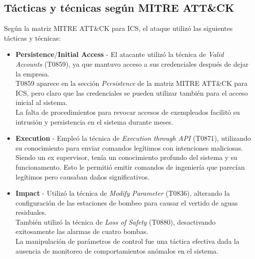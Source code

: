 \nl

\subsection{Tácticas y técnicas según MITRE ATT\&CK}
Según la matriz MITRE ATT\&CK para ICS, el ataque utilizó las siguientes tácticas y técnicas:

\begin{itemize}
    \item \textbf{Persistence}/\textbf{Initial Access} - El atacante utilizó la técnica de \textit{Valid Accounts} (T0859), ya que mantuvo acceso a sus credenciales después de dejar la empresa.\\
    T0859 aparece en la sección \textit{Persistence} de la matriz MITRE ATT\&CK para ICS, pero claro que las credenciales se pueden utilizar también para el acceso inicial al sistema.\\
    La falta de procedimientos para revocar accesos de exempleados facilitó su intrusión y persistencia en el sistema durante meses.
    
    
    \item \textbf{Execution} - Empleó la técnica de \textit{Execution through API} (T0871), utilizando su conocimiento para enviar comandos legítimos con intenciones maliciosas.\\
    Siendo un ex supervisor, tenía un conocimiento profundo del sistema y su funcionamento. Esto le permitió emitir comandos de ingeniería que parecían legítimos pero causaban daños significativos.
    
    \item \textbf{Impact} - Utilizó la técnica de \textit{Modify Parameter} (T0836), alterando la configuración de las estaciones de bombeo para causar el vertido de aguas residuales.\\
    También utilizó la técnica de \textit{Loss of Safety} (T0880), desactivando exitosamente las alarmas de cuatro bombas.\\
    La manipulación de parámetros de control fue una táctica efectiva dada la ausencia de monitoreo de comportamientos anómalos en el sistema.
\end{itemize}


